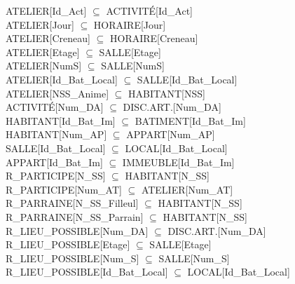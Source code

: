\documentclass[a4paper,10.5pt]{report}
\begin{document}
	ATELIER[Id\_Act] $\subseteq$ ACTIVITÉ[Id\_Act] \\

	ATELIER[Jour] $\subseteq$ HORAIRE[Jour] \\

	ATELIER[Creneau] $\subseteq$ HORAIRE[Creneau] \\

	ATELIER[Etage] $\subseteq$ SALLE[Etage] \\

	ATELIER[NumS] $\subseteq$ SALLE[NumS] \\

	ATELIER[Id\_Bat\_Local] $\subseteq$ SALLE[Id\_Bat\_Local] \\

	ATELIER[NSS\_Anime] $\subseteq$ HABITANT[NSS] \\

	ACTIVITÉ[Num\_DA] $\subseteq$ DISC.ART.[Num\_DA] \\

	HABITANT[Id\_Bat\_Im] $\subseteq$ BATIMENT[Id\_Bat\_Im] \\

	HABITANT[Num\_AP] $\subseteq$ APPART[Num\_AP] \\

	SALLE[Id\_Bat\_Local] $\subseteq$ LOCAL[Id\_Bat\_Local] \\

	APPART[Id\_Bat\_Im] $\subseteq$ IMMEUBLE[Id\_Bat\_Im] \\

	R\_PARTICIPE[N\_SS]  $\subseteq$ HABITANT[N\_SS] \\

	R\_PARTICIPE[Num\_AT] $\subseteq$ ATELIER[Num\_AT] \\

	R\_PARRAINE[N\_SS\_Filleul] $\subseteq$ HABITANT[N\_SS] \\

	R\_PARRAINE[N\_SS\_Parrain] $\subseteq$ HABITANT[N\_SS] \\

	R\_LIEU\_POSSIBLE[Num\_DA] $\subseteq$ DISC.ART.[Num\_DA] \\

	R\_LIEU\_POSSIBLE[Etage] $\subseteq$ SALLE[Etage] \\

	R\_LIEU\_POSSIBLE[Num\_S] $\subseteq$ SALLE[Num\_S] \\

	R\_LIEU\_POSSIBLE[Id\_Bat\_Local] $\subseteq$ LOCAL[Id\_Bat\_Local] \\
\end{document}
